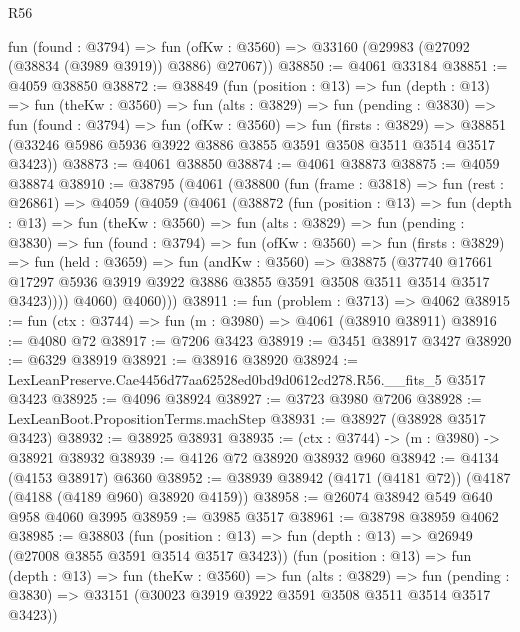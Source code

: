 \begin{lexlean}{R56}
\begin{coremodule}
    fun (found : @3794) =>
    fun (ofKw : @3560) => @33160 (@29983 (@27092 (@38834 (@3989 @3919)) @3886) @27067))
@38850 := @4061 @33184
@38851 := @4059 @38850
@38872 := @38849
    (fun (position : @13) =>
    fun (depth : @13) =>
    fun (theKw : @3560) =>
    fun (alts : @3829) =>
    fun (pending : @3830) =>
    fun (found : @3794) =>
    fun (ofKw : @3560) =>
    fun (firsts : @3829) =>
    @38851 (@33246 @5986 @5936 @3922 @3886 @3855 @3591 @3508 @3511 @3514 @3517 @3423))
@38873 := @4061 @38850
@38874 := @4061 @38873
@38875 := @4059 @38874
@38910 := @38795
    (@4061
      (@38800
        (fun (frame : @3818) =>
        fun (rest : @26861) =>
        @4059
          (@4059
            (@4061
              (@38872
                (fun (position : @13) =>
                fun (depth : @13) =>
                fun (theKw : @3560) =>
                fun (alts : @3829) =>
                fun (pending : @3830) =>
                fun (found : @3794) =>
                fun (ofKw : @3560) =>
                fun (firsts : @3829) =>
                fun (held : @3659) =>
                fun (andKw : @3560) =>
                @38875
                  (@37740
                    @17661
                    @17297
                    @5936
                    @3919
                    @3922
                    @3886
                    @3855
                    @3591
                    @3508
                    @3511
                    @3514
                    @3517
                    @3423))))
            @4060)
          @4060)))
@38911 := fun (problem : @3713) => @4062
@38915 := fun (ctx : @3744) => fun (m : @3980) => @4061 (@38910 @38911)
@38916 := @4080 @72
@38917 := @7206 @3423
@38919 := @3451 @38917 @3427
@38920 := @6329 @38919
@38921 := @38916 @38920
@38924 := LexLeanPreserve.Cae4456d77aa62528ed0bd9d0612cd278.R56.__fits_5 @3517 @3423
@38925 := @4096 @38924
@38927 := @3723 @3980 @7206
@38928 := LexLeanBoot.PropositionTerms.machStep
@38931 := @38927 (@38928 @3517 @3423)
@38932 := @38925 @38931
@38935 := (ctx : @3744) -> (m : @3980) -> @38921 @38932
@38939 := @4126 @72 @38920 @38932 @960
@38942 := @4134 (@4153 @38917) @6360
@38952 := @38939 @38942 (@4171 (@4181 @72)) (@4187 (@4188 (@4189 @960) @38920 @4159))
@38958 := @26074 @38942 @549 @640 @958 @4060 @3995
@38959 := @3985 @3517
@38961 := @38798 @38959 @4062
@38985 := @38803
    (fun (position : @13) => fun (depth : @13) => @26949 (@27008 @3855 @3591 @3514 @3517 @3423))
    (fun (position : @13) =>
    fun (depth : @13) =>
    fun (theKw : @3560) =>
    fun (alts : @3829) =>
    fun (pending : @3830) => @33151 (@30023 @3919 @3922 @3591 @3508 @3511 @3514 @3517 @3423))

\end{coremodule}
\end{lexlean}
